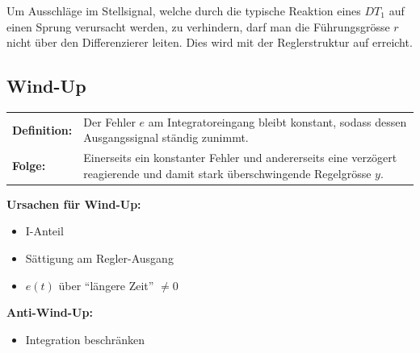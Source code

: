   Um Ausschläge im Stellsignal, welche durch die typische Reaktion eines $DT_1$ auf einen Sprung verursacht werden, zu verhindern, darf man die Führungsgrösse $r$ nicht über den Differenzierer leiten. Dies wird mit der Reglerstruktur auf  erreicht. 


	\subsection{Wind-Up }
  \begin{tabular}{lp{15cm}}
    \textbf{Definition:} &
    Der Fehler $e$ am Integratoreingang bleibt konstant, sodass dessen
    Ausgangssignal ständig zunimmt. \\
    
    \textbf{Folge:} & 
    Einerseits ein konstanter Fehler und andererseits eine verzögert reagierende
    und damit stark überschwingende Regelgrösse $y$.
  \end{tabular}

  \begin{multicols}{2}
    \textbf{Ursachen für Wind-Up:}
    \begin{itemize}[leftmargin=*]
      \item I-Anteil
      \item Sättigung am Regler-Ausgang
      \item $e(t)$ über "`längere Zeit"' $\neq 0$
    \end{itemize}
  
  \columnbreak
    
    \textbf{Anti-Wind-Up:}
    \begin{itemize}[leftmargin=*]
      \item Integration beschränken
    \end{itemize}
  
  
  \end{multicols}
  
  

